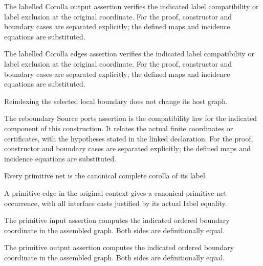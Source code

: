 The labelled Corolla output assertion verifies the indicated label compatibility or label exclusion at the original coordinate.
For the proof, constructor and boundary cases are separated explicitly; the defined maps and incidence equations are substituted.
\par{}

The labelled Corolla edges assertion verifies the indicated label compatibility or label exclusion at the original coordinate.
For the proof, constructor and boundary cases are separated explicitly; the defined maps and incidence equations are substituted.
\par{}

Reindexing the selected local boundary does not change its host graph.
\par{}

The reboundary Source ports assertion is the compatibility law for the indicated component of this construction. It relates the actual finite coordinates or certificates, with the hypotheses stated in the linked declaration.
For the proof, constructor and boundary cases are separated explicitly; the defined maps and incidence equations are substituted.
\par{}

Every primitive net is the canonical complete corolla of its label.
\par{}

A primitive edge in the original context gives a canonical primitive-net occurrence, with all interface casts justified by its actual label equality.
\par{}

The primitive input assertion computes the indicated ordered boundary coordinate in the assembled graph.
Both sides are definitionally equal.
\par{}

The primitive output assertion computes the indicated ordered boundary coordinate in the assembled graph.
Both sides are definitionally equal.
\par{}

